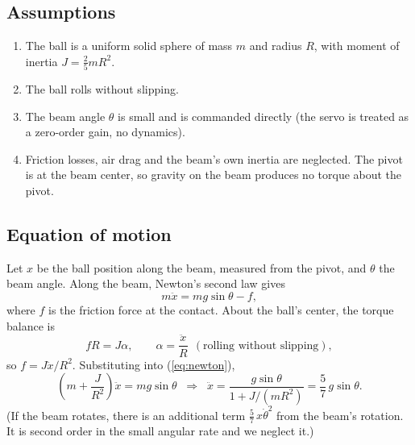 \documentclass[11pt]{article}
\begin{document}
\subsection{Assumptions}
\label{sec:orga4a0de8}
\begin{enumerate}
\item The ball is a uniform solid sphere of mass \(m\) and radius \(R\), with moment of inertia \(J = \tfrac{2}{5} m R^2\).
\item The ball rolls without slipping.
\item The beam angle \(\theta\) is small and is commanded directly (the servo is treated as a zero-order gain, no dynamics).
\item Friction losses, air drag and the beam's own inertia are neglected. The pivot is at the beam center, so gravity on the beam produces no torque about the pivot.
\end{enumerate}
\subsection{Equation of motion}
\label{sec:orgd22a399}
Let \(x\) be the ball position along the beam, measured from the pivot, and \(\theta\) the beam angle. Along the beam, Newton's second law gives
\begin{equation}
m\ddot{x} = m g \sin\theta - f,
\label{eq:newton}
\end{equation}
where \(f\) is the friction force at the contact. About the ball's center, the torque balance is
\begin{equation}
f R = J \alpha, \qquad \alpha = \frac{\ddot{x}}{R}\ \ (\text{rolling without slipping}),
\label{eq:torque}
\end{equation}
so \(f = J\ddot{x}/R^2\). Substituting into (\ref{eq:newton}),
\begin{equation}
\left(m + \frac{J}{R^2}\right)\ddot{x} = m g \sin\theta
\;\;\Longrightarrow\;\;
\ddot{x} = \frac{g\sin\theta}{1 + J/(mR^2)} = \frac{5}{7}\, g \sin\theta .
\label{eq:nonlinear}
\end{equation}
(If the beam rotates, there is an additional term \(\tfrac{5}{7}\,x\dot\theta^{2}\) from the beam's rotation. It is second order in the small angular rate and we neglect it.)
\end{document}

